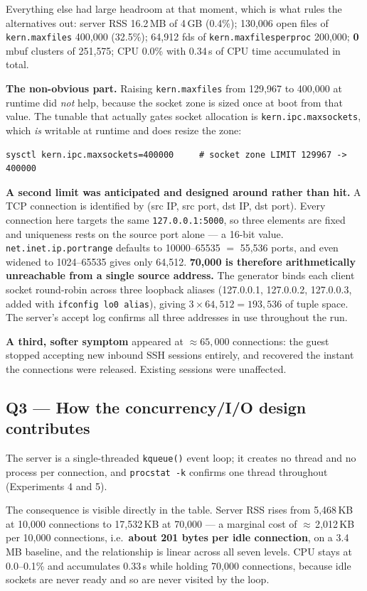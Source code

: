 \documentclass[11pt,a4paper]{article}
\newcommand{\cmd}[1]{\texttt{\small #1}}
\begin{document}
Everything else had large headroom at that moment, which is what rules the
alternatives out: server RSS 16.2\,MB of 4\,GB (0.4\%); 130{,}006 open files of
\cmd{kern.maxfiles} 400{,}000 (32.5\%); 64{,}912 fds of
\cmd{kern.maxfilesperproc} 200{,}000; \textbf{0} mbuf clusters of 251{,}575; CPU
0.0\% with 0.34\,s of CPU time accumulated in total.

\textbf{The non-obvious part.} Raising \cmd{kern.maxfiles} from 129{,}967 to
400{,}000 at runtime did \emph{not} help, because the socket zone is sized once
at boot from that value. The tunable that actually gates socket allocation is
\cmd{kern.ipc.maxsockets}, which \emph{is} writable at runtime and does resize
the zone:
\begin{Verbatim}[fontsize=\small,frame=single]
sysctl kern.ipc.maxsockets=400000     # socket zone LIMIT 129967 -> 400000
\end{Verbatim}

\textbf{A second limit was anticipated and designed around rather than hit.} A
TCP connection is identified by (src IP, src port, dst IP, dst port). Every
connection here targets the same \cmd{127.0.0.1:5000}, so three elements are
fixed and uniqueness rests on the source port alone --- a 16-bit value.
\cmd{net.inet.ip.portrange} defaults to 10000--65535 $=$ 55{,}536 ports, and even
widened to 1024--65535 gives only 64{,}512. \textbf{70{,}000 is therefore
arithmetically unreachable from a single source address.} The generator binds
each client socket round-robin across three loopback aliases (127.0.0.1,
127.0.0.2, 127.0.0.3, added with \cmd{ifconfig lo0 alias}), giving
$3 \times 64{,}512 = 193{,}536$ of tuple space. The server's accept log confirms
all three addresses in use throughout the run.

\textbf{A third, softer symptom} appeared at ${\approx}65{,}000$ connections: the
guest stopped accepting new inbound SSH sessions entirely, and recovered the
instant the connections were released. Existing sessions were unaffected.

\subsection{Q3 --- How the concurrency/I/O design contributes}

The server is a single-threaded \cmd{kqueue()} event loop; it creates no thread
and no process per connection, and \cmd{procstat -k} confirms one thread
throughout (Experiments 4 and 5).

The consequence is visible directly in the table. Server RSS rises from
5{,}468\,KB at 10{,}000 connections to 17{,}532\,KB at 70{,}000 --- a marginal
cost of $\approx$\,2{,}012\,KB per 10{,}000 connections, i.e.\ \textbf{about 201
bytes per idle connection}, on a 3.4\,MB baseline, and the relationship is linear
across all seven levels. CPU stays at 0.0--0.1\% and accumulates 0.33\,s while
holding 70{,}000 connections, because idle sockets are never ready and so are
never visited by the loop.
\end{document}
